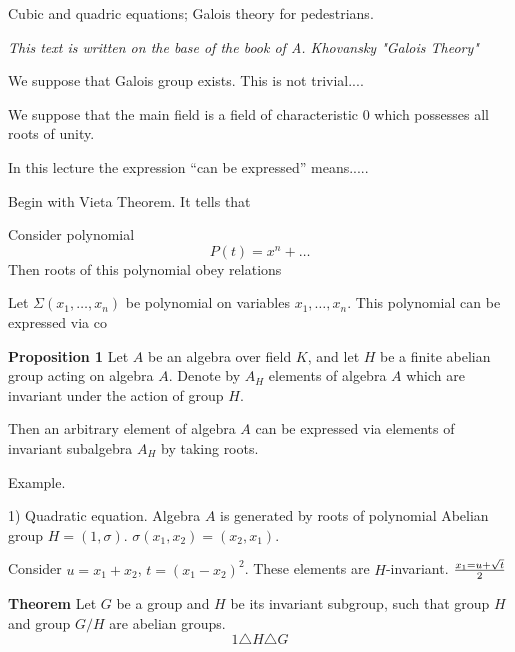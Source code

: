 



 \baselineskip=14pt


\def\p {\partial}
\def \D {\Delta_{d{\bf v}}}
\def \Ds  {\Delta^{\#}}
\def\t{\tilde}
\def\s {\sigma}
\def\vare {\varepsilon}
\def\L {\Lambda}
\def\Darboux {$z^A=$  $x^1,\dots,x^n$, $\theta_1,\dots,\theta_n$}
\def\a{\alpha}
\def\O{\Omega}
\def\d{\delta}
\def\dv  {{d{\bf{v}}}}
\def\A {{\cal A}}
\def\R {I\!R}
\def\t {\tilde}
\def\l {\lambda}
\def\e {{\bf e}}
\def\x {{\bf x}}
\def\y {{\bf y}}

             \centerline {Cubic and quadric equations; Galois theory for pedestrians.}

{\it This text is written on the base of the book of A. Khovansky
"Galois Theory"}

 We suppose that Galois group exists. This is not trivial.... 

   We suppose that the main field is a field of characteristic
   $0$ which possesses all roots of unity.

In this lecture the expression
``can be expressed'' means.....

  Begin with Vieta Theorem. It tells that 




 Consider polynomial
       $$
P(t)=x^n+\dots
       $$
Then roots of this polynomial obey relations
  
Let $\Sigma(x_1,\dots,x_n)$ be polynomial on variables $x_1,\dots,x_n$.
This polynomial can be expressed via co


 {\bf Proposition 1} Let $A$ be an algebra over field $K$,
and let $H$ be a finite abelian group acting on algebra $A$.
   Denote by $A_H$ elements of algebra $A$ which are invariant under
the action of group $H$.

   Then an arbitrary element of algebra $A$ can be expressed via
elements of invariant subalgebra $A_H$ by taking roots.


   Example.

1) Quadratic equation. 
Algebra $A$ is generated by roots of polynomial
  Abelian group $H=(1,\s)$. $\s(x_1,x_2)=(x_2,x_1)$.

   Consider  $u=x_1+x_2$, $t=(x_1-x_2)^2$. These elements are
 $H$-invariant. $x_1=u+\sqrt t\over 2$ 
         


{\bf Theorem } 
  Let $G$ be a group and $H$ be its invariant subgroup, such that
group $H$ and group $G/H$ are abelian groups.
            $$
    1\triangle H\triangle G
            $$ 


